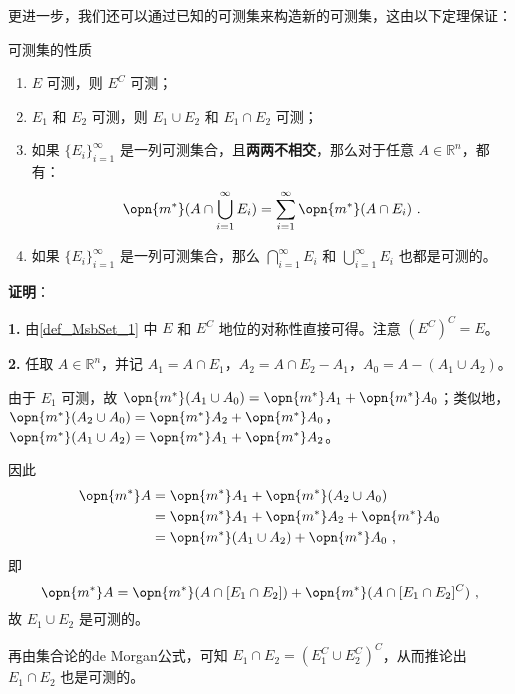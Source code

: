更进一步，我们还可以通过已知的可测集来构造新的可测集，这由以下定理保证：

\begin{theorem}{可测集的性质}\label{the_MsbSet_1}

\begin{enumerate}
\item $E$ 可测，则 $E^C$ 可测；
\item $E_1$ 和 $E_2$ 可测，则 $E_1\cup E_2$ 和 $E_1\cap E_2$ 可测；
\item 如果 $\{E_i\}_{i=1}^{\infty}$ 是一列可测集合，且\textbf{两两不相交}，那么对于任意 $A\in\mathbb{R}^n$，都有：
\begin{equation}\label{eq_MsbSet_4}
\opn{m^*}(A\cap \bigcup_{i=1}^{\infty}E_i)=\sum_{i=1}^{\infty}\opn{m^*}(A\cap E_i)~.
\end{equation}
\item 如果 $\{E_i\}_{i=1}^{\infty}$ 是一列可测集合，那么 $\bigcap_{i=1}^{\infty}E_i$ 和 $\bigcup_{i=1}^{\infty}E_i$ 也都是可测的。
\end{enumerate}

\end{theorem}

\textbf{证明}：


\textbf{1.} 由\autoref{def_MsbSet_1} 中 $E$ 和 $E^C$ 地位的对称性直接可得。注意 $(E^C)^C=E$。

\textbf{2.} 任取 $A\in\mathbb{R}^n$，并记 $A_1=A\cap E_1$，$A_2=A\cap E_2-A_1$，$A_0=A-(A_1\cup A_2)$。


由于 $E_1$ 可测，故 $\opn{m^*}(A_1\cup A_0)=\opn{m^*}A_1+\opn{m^*}A_0$；类似地，$\opn{m^*}(A_2\cup A_0)=\opn{m^*}A_2+\opn{m^*}A_0$，$\opn{m^*}(A_1\cup A_2)=\opn{m^*}A_1+\opn{m^*}A_2$。

因此
\begin{equation}
\begin{aligned}
\opn{m^*}A&=\opn{m^*}A_1+\opn{m^*}(A_2\cup A_0)\\
&=\opn{m^*}A_1+\opn{m^*}A_2+\opn{m^*}A_0\\
&=\opn{m^*}(A_1\cup A_2)+\opn{m^*}A_0~,
\end{aligned}
\end{equation}
即
\begin{equation}
\opn{m^*}A=\opn{m^*}(A\cap [E_1\cap E_2])+\opn{m^*}(A\cap [E_1\cap E_2]^C)~,
\end{equation}
故 $E_1\cup E_2$ 是可测的。

再由集合论的de Morgan公式，可知 $E_1\cap E_2=(E_1^C\cup E_2^C)^C$，从而推论出 $E_1\cap E_2$ 也是可测的。

